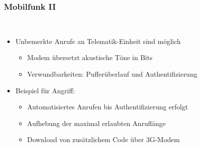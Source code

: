 \documentclass[t]{beamer}
\begin{document}
\begin{frame}
	\frametitle{Mobilfunk II}
    \ \par
    \begin{itemize}
		\item Unbemerkte Anrufe an Telematik-Einheit sind möglich
        \begin{itemize}
        	\item Modem übersetzt akustische Töne in Bits
            \item Verwundbarkeiten: Pufferüberlauf und Authentifizierung
        \end{itemize}
	\end{itemize}

    \begin{itemize}
        \item Beispiel für Angriff:
        \begin{itemize}
        	\item Automatisiertes Anrufen bis Authentifizierung erfolgt
            \item Aufhebung der maximal erlaubten Anruflänge
            \item Download von zusätzlichem Code über 3G-Modem
        \end{itemize}
    \end{itemize}
\end{frame}
\end{document}
